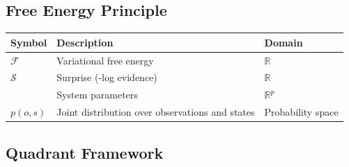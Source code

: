 \documentclass[
]{article}
\newcounter{none} %
\begin{document}
\subsection{Free Energy Principle}\label{free-energy-principle}

{\def\LTcaptype{none} %
\begin{longtable}[]{@{}
  >{\raggedright\arraybackslash}p{}
  >{\raggedright\arraybackslash}p{}
  >{\raggedright\arraybackslash}p{}@{}}
\toprule\noalign{}
\begin{minipage}[b]{\linewidth}\raggedright
Symbol
\end{minipage} & \begin{minipage}[b]{\linewidth}\raggedright
Description
\end{minipage} & \begin{minipage}[b]{\linewidth}\raggedright
Domain
\end{minipage} \\
\midrule\noalign{}
\endhead
\bottomrule\noalign{}
\endlastfoot
\(\mathcal{F}\) & Variational free energy & \(\mathbb{R}\) \\
\(\mathcal{S}\) & Surprise (-log evidence) & \(\mathbb{R}\) \\
\(\phi) & System parameters & \(\mathbb{R}^p\) \\
\(p(o,s)\) & Joint distribution over observations and states &
Probability space \\
\end{longtable}
}

\subsection{Quadrant Framework}\label{quadrant-framework}
\end{document}
